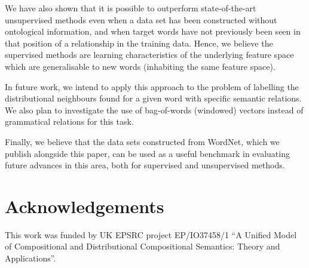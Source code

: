\documentclass[11pt]{article}
\begin{document}
We have also shown that it is possible to outperform  state-of-the-art unsupervised methods even when a data set has been constructed without ontological information, and when target words have not previously been seen in that position of a relationship in the training data.  Hence, we believe the supervised methods are learning characteristics of the underlying feature space which are generalisable to new words (inhabiting the same feature space).  

In future work, we intend to apply this approach to the problem of
labelling the distributional neighbours found for a given word with
specific semantic relations. We also plan to investigate the use of
bag-of-words (windowed) vectors instead of grammatical relations for
this task.

Finally, we believe that the data sets constructed from WordNet, which we publish alongside this paper,  can be used as a useful benchmark in evaluating future advances in this area, both for supervised and unsupervised methods.

\section*{Acknowledgements}
This work was funded by UK EPSRC project EP/IO37458/1 ``A Unified Model of Compositional and Distributional Compositional Semantics: Theory and Applications''.

\newpage



\end{document}

